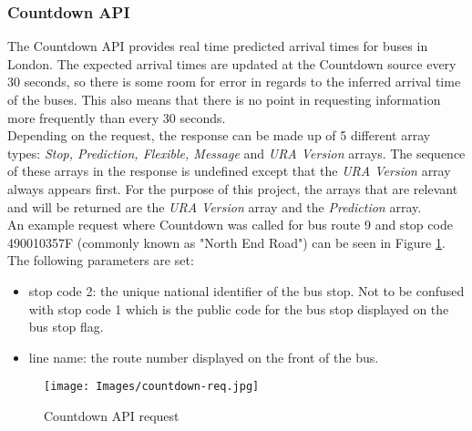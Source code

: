 \subsubsection{Countdown API}

The Countdown API provides real time predicted arrival times for buses in London. The expected arrival times are updated at the Countdown source every 30 seconds, so there is some room for error in regards to the inferred arrival time of the buses. This also means that there is no point in requesting information more frequently than every 30 seconds. \\

Depending on the request, the response can be made up of 5 different array types: \textit{Stop, Prediction, Flexible, Message} and \textit{URA Version} arrays. The sequence of these arrays in the response is undefined except that the \textit{URA Version} array always appears first. For the purpose of this project, the arrays that are relevant and will be returned are the \textit{URA Version} array and the \textit{Prediction} array. \\

An example request where Countdown was called for bus route 9 and stop code 490010357F (commonly known as "North End Road") can be seen in Figure \ref{fig:countdown-req}. The following parameters are set: 
\begin{itemize}
    \item stop code 2: the unique national identifier of the bus stop. Not to be confused with stop code 1 which is the public code for the bus stop displayed on the bus stop flag.
    \item line name: the route number displayed on the front of the bus.
\end{itemize}

\begin{figure}[H]
\begin{center}
    \texttt{[image: Images/countdown-req.jpg]}
    \caption{Countdown API request}
    \label{fig:countdown-req}
\end{center}
\end{figure}

